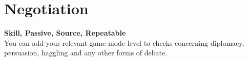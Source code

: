 \section{Negotiation}\label{sec:negotiation}
\textbf{Skill, Passive, Source, Repeatable}\\
You can add your relevant game mode level to checks concerning diplomacy, persuasion, haggling and any other forms of debate.